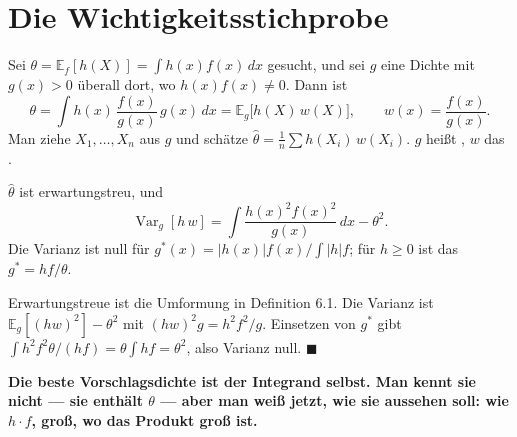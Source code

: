 \section{Die Wichtigkeitsstichprobe}

\begin{definition}
Sei $\theta = \mathbb E_f[h(X)] = \int h(x) f(x)\,dx$ gesucht, und sei $g$ eine Dichte mit $g(x)>0$ überall dort, wo $h(x)f(x)\neq0$. Dann ist
\[ \theta = \int h(x)\,\frac{f(x)}{g(x)}\,g(x)\,dx = \mathbb E_g\big[h(X)\,w(X)\big], \qquad w(x) = \frac{f(x)}{g(x)} . \]
Man ziehe $X_1,\ldots,X_n$ aus $g$ und schätze $\hat\theta = \frac1n\sum h(X_i)\,w(X_i)$. $g$ heißt , $w$ das .
\end{definition}

\begin{merksatz}
$\hat\theta$ ist erwartungstreu, und
\[ \operatorname{Var}_g[h\,w] = \int \frac{h(x)^2 f(x)^2}{g(x)}\,dx - \theta^2 . \]
Die Varianz ist null für $g^*(x) = |h(x)|f(x)/\int|h|f$; für $h\ge0$ ist das $g^* = hf/\theta$.

Erwartungstreue ist die Umformung in Definition 6.1. Die Varianz ist $\mathbb E_g[(hw)^2] - \theta^2$ mit $(hw)^2 g = h^2f^2/g$. Einsetzen von $g^*$ gibt $\int h^2f^2\theta/(hf) = \theta\int hf = \theta^2$, also Varianz null. $\blacksquare$

\begin{center}
\begin{minipage}{0.9\textwidth}
\textbf{Die beste Vorschlagsdichte ist der Integrand selbst. Man kennt sie nicht --- sie enthält $\theta$ --- aber man weiß jetzt, wie sie aussehen soll: wie $h\cdot f$, groß, wo das Produkt groß ist.}
\end{minipage}
\end{center}

\begin{center}
\begin{minipage}{0.88\textwidth}
\end{minipage}
\end{center}
\end{merksatz}

